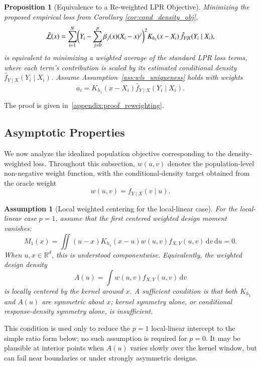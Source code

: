 \documentclass[preprint,1p,times,authoryear]{elsarticle}
\newtheorem{proposition}{Proposition}
\newtheorem{assumption}{Assumption}
\begin{document}
\begin{proposition}[Equivalence to a Re-weighted LPR Objective]
\label{prop:reweighting}
Minimizing the proposed empirical loss from Corollary \ref{cor:cond_density_obj},
\[
\tilde{\mathcal{L}}(x)
=\sum_{i=1}^{N}
\Bigl(Y_i-\sum_{j=0}^{p}\beta_j(x)(X_i - x)^j\Bigr)^2
K_{h_1}(x-X_i)\,\hat f_{Y\mid X}(Y_i\mid X_i),
\]
is equivalent to minimizing a weighted average of the standard LPR loss terms, where each term's contribution is scaled by its estimated conditional density $\hat f_{Y\mid X}(Y_i\mid X_i)$. Assume Assumption~\ref{ass:wls_uniqueness} holds with weights
\[
a_i=K_{h_1}(x-X_i)\hat f_{Y\mid X}(Y_i\mid X_i).
\]
\end{proposition}
The proof is given in~\ref{appendix:proof_reweighting}.

\subsection{Asymptotic Properties}
We now analyze the idealized population objective corresponding to the density-weighted loss. Throughout this subsection, \(w(u,v)\) denotes the population-level non-negative weight function, with the conditional-density target obtained from the oracle weight
\[
w(u,v)=f_{Y\mid X}(v\mid u).
\]

\begin{assumption}[Local weighted centering for the local-linear case]
\label{ass:local_weighted_centering}
For the local-linear case \(p=1\), assume that the first centered weighted design moment vanishes:
\[
M_1(x)
=
\iint
(u-x)K_{h_1}(x-u)w(u,v)f_{X,Y}(u,v)\,\mathrm d v\,\mathrm d u
=
0.
\]
When \(u,x\in\mathbb R^d\), this is understood componentwise. Equivalently, the weighted design density
\[
A(u)=\int w(u,v)f_{X,Y}(u,v)\,\mathrm d v
\]
is locally centered by the kernel around \(x\). A sufficient condition is that both \(K_{h_1}\) and \(A(u)\) are symmetric about \(x\); kernel symmetry alone, or conditional response-density symmetry alone, is insufficient.
\end{assumption}

This condition is used only to reduce the \(p=1\) local-linear intercept to the simple ratio form below; no such assumption is required for \(p=0\). It may be plausible at interior points when \(A(u)\) varies slowly over the kernel window, but can fail near boundaries or under strongly asymmetric designs.
\end{document}
